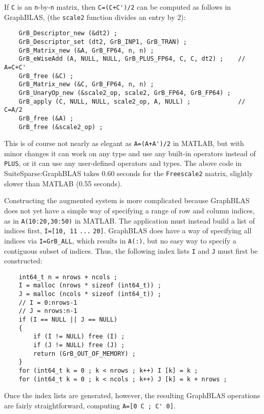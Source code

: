 \documentclass[12pt]{article}
\begin{document}
If \verb'C' is an \verb'n'-by-\verb'n' matrix, then \verb"C=(C+C')/2" can be
computed as follows in GraphBLAS, (the \verb'scale2' function divides an entry
by 2):

    {\footnotesize
    \begin{verbatim}
    GrB_Descriptor_new (&dt2) ;
    GrB_Descriptor_set (dt2, GrB_INP1, GrB_TRAN) ;
    GrB_Matrix_new (&A, GrB_FP64, n, n) ;
    GrB_eWiseAdd (A, NULL, NULL, GrB_PLUS_FP64, C, C, dt2) ;    // A=C+C'
    GrB_free (&C) ;
    GrB_Matrix_new (&C, GrB_FP64, n, n) ;
    GrB_UnaryOp_new (&scale2_op, scale2, GrB_FP64, GrB_FP64) ;
    GrB_apply (C, NULL, NULL, scale2_op, A, NULL) ;             // C=A/2
    GrB_free (&A) ;
    GrB_free (&scale2_op) ; \end{verbatim}}

This is of course not nearly as elegant as \verb"A=(A+A')/2" in MATLAB, but
with minor changes it can work on any type and use any built-in operators
instead of \verb'PLUS', or it can use any user-defined operators and types.
The above code in SuiteSparse:GraphBLAS takes 0.60 seconds for the
\verb'Freescale2' matrix, slightly slower than MATLAB (0.55 seconds).

Constructing the augmented system is more complicated because GraphBLAS does
not yet have a simple way of specifying a range of row and column indices, as
in \verb'A(10:20,30:50)' in MATLAB.  The application must instead build a list
of indices first, \verb'I=[10, 11' \verb'...' \verb'20]'.  GraphBLAS does have
a way of specifying all indices via \verb'I=GrB_ALL', which results in
\verb'A(:)', but no easy way to specify a contiguous subset of indices.  Thus,
the following index lists \verb'I' and \verb'J' must first be constructed:

    \newpage
    {\footnotesize
    \begin{verbatim}
    int64_t n = nrows + ncols ;
    I = malloc (nrows * sizeof (int64_t)) ;
    J = malloc (ncols * sizeof (int64_t)) ;
    // I = 0:nrows-1
    // J = nrows:n-1
    if (I == NULL || J == NULL)
    {
        if (I != NULL) free (I) ;
        if (J != NULL) free (J) ;
        return (GrB_OUT_OF_MEMORY) ;
    }
    for (int64_t k = 0 ; k < nrows ; k++) I [k] = k ;
    for (int64_t k = 0 ; k < ncols ; k++) J [k] = k + nrows ; \end{verbatim}}

Once the index lists are generated, however, the resulting GraphBLAS operations
are fairly straightforward, computing \verb"A=[0 C ; C' 0]".
\end{document}
